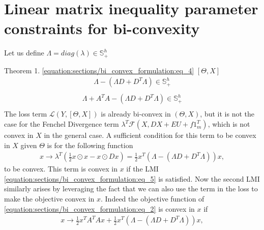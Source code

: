 \documentclass[letterpaper,10pt,english]{sphinxmanual}
\begin{document}
\section{Linear matrix inequality parameter constraints for bi-convexity}
\label{\detokenize{sections/bi_convex_formulation:linear-matrix-inequality-parameter-constraints-for-bi-convexity}}
Let us define \(\Lambda = diag(\lambda) \in \mathbb{S}_+^h\)

Theorem 1.  \eqref{equation:sections/bi_convex_formulation:eq_4}  \([\Theta,X]\) 
\begin{equation}\label{equation:sections/bi_convex_formulation:eq_5}
\begin{split}\Lambda - (\Lambda D + D^T \Lambda) \in \mathbb{S}_+^h \\\end{split}
\end{equation}\begin{equation}\label{equation:sections/bi_convex_formulation:eq_6}
\begin{split}\Lambda + A^TA - (\Lambda D + D^T \Lambda) \in \mathbb{S}_+^h \\\end{split}
\end{equation}
 The loss term \(\mathcal{L}(Y,[\Theta,X])\) is already bi-convex in \((\Theta,X)\), but it is not the case for the Fenchel
Divergence term \(\lambda^T \mathcal{F}(X,DX + EU + f1_m^T)\), which is not convex in \(X\) in the general case. A sufficient
condition for this term to be convex in \(X\) given \(\Theta\) is for the following function
\begin{equation*}
\begin{split}x \rightarrow \lambda^T(\frac{1}{2} x \odot x - x \odot Dx) = \frac{1}{2}x^T(\Lambda - (\Lambda D + D^T \Lambda))x,\end{split}
\end{equation*}
to be convex. This term is convex in \(x\) if the LMI \eqref{equation:sections/bi_convex_formulation:eq_5} is satisfied. Now the second LMI similarly arises by
leveraging the fact that we can also use the term in the loss to make the objective convex in \(x\). Indeed the
objective function of \eqref{equation:sections/bi_convex_formulation:eq_2} is convex in \(x\) if
\begin{equation*}
\begin{split}x \rightarrow \frac{1}{2}x^TA^TAx + \frac{1}{2}x^T(\Lambda - (\Lambda D + D^T \Lambda))x,\end{split}
\end{equation*}
\end{document}
